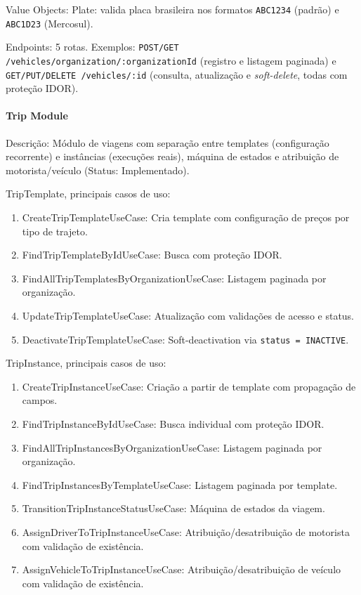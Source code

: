 Value Objects: Plate: valida placa brasileira nos formatos \texttt{ABC1234} (padrão) e \texttt{ABC1D23} (Mercosul).

Endpoints: 5 rotas. Exemplos: \texttt{POST/GET /vehicles/organization/:organizationId} (registro e listagem paginada) e \texttt{GET/PUT/DELETE /vehicles/:id} (consulta, atualização e \textit{soft-delete}, todas com proteção IDOR).

\paragraph{Trip Module}

Descrição: Módulo de viagens com separação entre templates (configuração recorrente) e instâncias (execuções reais), máquina de estados e atribuição de motorista/veículo (Status: Implementado).

TripTemplate, principais casos de uso:
\begin{enumerate}
\item CreateTripTemplateUseCase: Cria template com configuração de preços por tipo de trajeto.
\item FindTripTemplateByIdUseCase: Busca com proteção IDOR.
\item FindAllTripTemplatesByOrganizationUseCase: Listagem paginada por organização.
\item UpdateTripTemplateUseCase: Atualização com validações de acesso e status.
\item DeactivateTripTemplateUseCase: Soft-deactivation via \texttt{status = INACTIVE}.
\end{enumerate}

TripInstance, principais casos de uso:
\begin{enumerate}
\item CreateTripInstanceUseCase: Criação a partir de template com propagação de campos.
\item FindTripInstanceByIdUseCase: Busca individual com proteção IDOR.
\item FindAllTripInstancesByOrganizationUseCase: Listagem paginada por organização.
\item FindTripInstancesByTemplateUseCase: Listagem paginada por template.
\item TransitionTripInstanceStatusUseCase: Máquina de estados da viagem.
\item AssignDriverToTripInstanceUseCase: Atribuição/desatribuição de motorista com validação de existência.
\item AssignVehicleToTripInstanceUseCase: Atribuição/desatribuição de veículo com validação de existência.
\end{enumerate}

